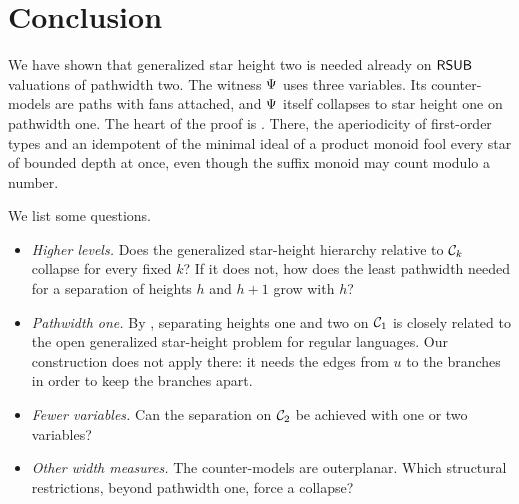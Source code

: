 \section{Conclusion}\label{section: conclusion}

We have shown that generalized star height two is needed already on $\mathsf{RSUB}$ valuations of pathwidth two.
The witness $\Psi$ uses three variables.
Its counter-models are paths with fans attached, and $\Psi$ itself collapses to star height one on pathwidth one.
The heart of the proof is .
There, the aperiodicity of first-order types and an idempotent of the minimal ideal of a product monoid fool every star of bounded depth at once, even though the suffix monoid may count modulo a number.

We list some questions.
\begin{itemize}
  \item \emph{Higher levels.}
        Does the generalized star-height hierarchy relative to $\mathcal{C}_{k}$ collapse for every fixed $k$?
        If it does not, how does the least pathwidth needed for a separation of heights $h$ and $h+1$ grow with $h$?
  \item \emph{Pathwidth one.}
        By , separating heights one and two on $\mathcal{C}_{1}$ is closely related to the open generalized star-height problem for regular languages.
        Our construction does not apply there: it needs the edges from $u$ to the branches in order to keep the branches apart.
  \item \emph{Fewer variables.}
        Can the separation on $\mathcal{C}_{2}$ be achieved with one or two variables?
  \item \emph{Other width measures.}
        The counter-models are outerplanar.
        Which structural restrictions, beyond pathwidth one, force a collapse?
\end{itemize}
